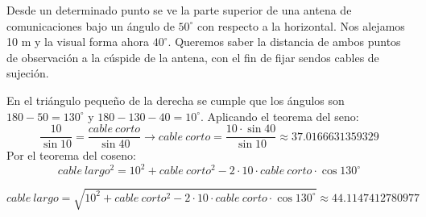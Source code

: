\documentclass[addpoints,spanish, 12pt,a4paper]{exam}
\begin{document}
\begin{questions}


    \question[2] Desde un determinado punto se ve la parte superior de una antena de comunicaciones bajo un ángulo de $50^\circ$ con respecto a la horizontal. Nos alejamos 10 m y la visual forma ahora $40^\circ$. Queremos saber la distancia de ambos puntos de observación a la cúspide de la antena, con el fin de fijar sendos cables de sujeción.
\begin{solution}

    En el triángulo pequeño de la derecha se cumple que los ángulos son $180-50=130^\circ$ y $180-130-40=10^\circ$. Aplicando el teorema del seno:
    $$\dfrac{10}{\sin{10}}=\dfrac{cable\ corto}{\sin{40}} \to cable\ corto=\dfrac{10\cdot\sin{40}}{\sin{10}}\approx 37.0166631359329
    $$
    Por el teorema del coseno:
    $$cable\ largo^2=10^2 + cable\ corto^2 - 2\cdot 10\cdot cable \ corto \cdot \cos{130^\circ}$$
    
    $$cable \ largo =\sqrt{10^2 + cable\ corto^2 - 2\cdot 10\cdot cable \ corto \cdot \cos{130^\circ}}\approx 44.1147412780977$$

\end{solution}

\addpoints
\end{questions}
\end{document}
